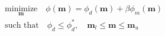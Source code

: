 \begin{equation}
\begin{split}
&\underset{\mathbf{m}}{\text{minimize}} \quad \phi(\mathbf{m}) = \phi_d(\mathbf{m}) + \beta \phi_m(\mathbf{m}) \\
&\text{such that} \quad \phi_d \leq \phi_d^*, \quad \mathbf{m}_l \leq \mathbf{m} \leq \mathbf{m}_u
\end{split}
\label{eq:inverse_problem}
\end{equation}
